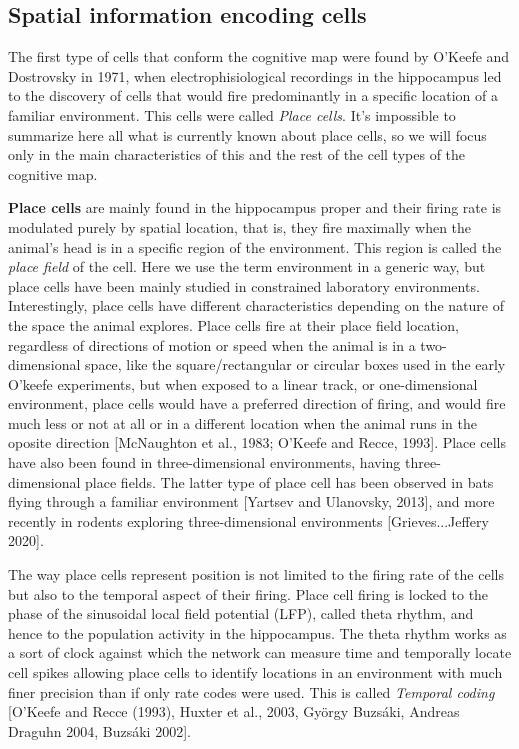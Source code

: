 \subsection{Spatial information encoding cells}
\label{chap1:sec:1:subsec2:spat_info_cells}
The first type of cells that conform the cognitive map were found by O’Keefe and Dostrovsky in 1971, when electrophisiological recordings in the hippocampus led to the discovery of cells that would fire predominantly in a specific location of a familiar environment.
This cells were called \textit{Place cells}. 
It's impossible to summarize here all what is currently known about place cells, so we will focus only in the main characteristics of this and the rest of the cell types of the cognitive map.

\textbf{Place cells} are mainly found in the hippocampus proper and their firing rate is modulated purely by spatial location, that is, they fire maximally when the animal's head is in a specific region of the environment. 
This region is called the \textit{place field} of the cell.  
Here we use the term environment in a generic way, but place cells have been mainly studied in constrained laboratory environments.
Interestingly, place cells have different characteristics depending on the nature of the space the animal explores.
Place cells fire at their place field location, regardless of directions of motion or speed when the animal is in a two-dimensional space, like the square/rectangular or circular boxes used in the early O'keefe experiments, but when exposed to a linear track, or one-dimensional environment, place cells would have a preferred direction of firing, and would fire much less or not at all or in a different location when the animal runs in the oposite direction [McNaughton et al., 1983; O’Keefe and Recce, 1993].
Place cells have also been found in three-dimensional environments, having three-dimensional place fields.
The latter type of place cell has been observed in bats flying through a familiar environment [Yartsev and Ulanovsky, 2013], and more recently in rodents exploring three-dimensional environments [Grieves...Jeffery 2020].

The way place cells represent position is not limited to the firing rate of the cells but also to the temporal aspect of their firing. 
Place cell firing is locked to the phase of the sinusoidal local field potential (LFP), called theta rhythm, and hence to the population activity in the hippocampus. 
The theta rhythm works as a sort of clock against which the network can measure time and temporally locate cell spikes allowing place cells to identify locations in an environment with much finer precision than if only rate codes were used.
This is called \textit{Temporal coding} [O’Keefe and Recce (1993), Huxter et al., 2003, György Buzsáki, Andreas Draguhn 2004, Buzsáki 2002].

